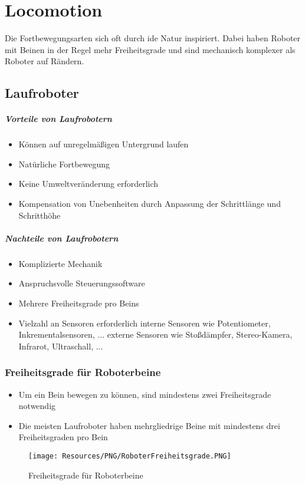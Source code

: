 \chapter{Locomotion}
Die Fortbewegungsarten sich oft durch ide Natur inspiriert. Dabei haben Roboter
mit Beinen in der Regel mehr Freiheitsgrade und sind mechanisch komplexer als
Roboter auf Rändern.

\section{Laufroboter}
\paragraph{Vorteile von Laufrobotern}
\begin{itemize}
	\item Können auf unregelmäßigen Untergrund laufen
	\item Natürliche Fortbewegung
	\item Keine Umweltveränderung erforderlich
	\item Kompensation von Unebenheiten durch Anpassung der Schrittlänge und
		Schritthöhe 
\end{itemize}

\paragraph{Nachteile von Laufrobotern}
\begin{itemize}
	\item Komplizierte Mechanik
	\item Anspruchsvolle Steuerungssoftware
	\item Mehrere Freiheitsgrade pro Beins
	\item Vielzahl an Sensoren erforderlich
	\subitem interne Sensoren wie Potentiometer, Inkrementalsensoren, ...
	\subitem externe Sensoren wie Stoßdämpfer, Stereo-Kamera, Infrarot,
		Ultraschall, ...
\end{itemize}

\subsection{Freiheitsgrade für Roboterbeine}
\begin{itemize}
	\item Um ein Bein bewegen zu können, sind mindestens zwei Freiheitsgrade
		notwendig
	\item Die meisten Laufroboter haben mehrgliedrige Beine mit mindestens drei
		Freiheitsgraden pro Bein
\end{itemize}
\begin{figure}[H]
	\begin{center}
		\texttt{[image: Resources/PNG/RoboterFreiheitsgrade.PNG]}
		\caption{Freiheitsgrade für Roboterbeine}
		\label{fig:Resources/PNG/RoboterFreiheitsgrade.PNG}
	\end{center}
\end{figure}

